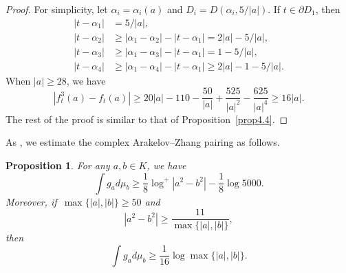\documentclass[10pt,a4paper]{amsart}
\numberwithin{equation}{section}
\theoremstyle{plain}
\newtheorem{prop}[thm]{Proposition}
\theoremstyle{definition}
\theoremstyle{remark}
\begin{document}
\begin{proof}
For simplicity, let $\alpha_{i}=\alpha_{i}(a)$ and $D_{i}=D(\alpha_{i},5/|a|)$.
If $t\in\partial D_{1}$, then
\begin{align*}
|t-\alpha_{1}| & =5/|a|,\\
|t-\alpha_{2}| & \geq|\alpha_{1}-\alpha_{2}|-|t-\alpha_{1}|=2|a|-5/|a|,\\
|t-\alpha_{3}| & \geq|\alpha_{1}-\alpha_{3}|-|t-\alpha_{1}|=1-5/|a|,\\
|t-\alpha_{4}| & \geq|\alpha_{1}-\alpha_{4}|-|t-\alpha_{1}|\geq2|a|-1-5/|a|.
\end{align*}
When $|a|\geq28$, we have
\[
\left|f_{t}^{3}(a)-f_{t}(a)\right|\geq20|a|-110-\frac{50}{|a|}+\frac{525}{|a|^{2}}-\frac{625}{|a|^{4}}\geq16|a|.
\]
The rest of the proof is similar to that of Proposition~\ref{prop4.4}.
\end{proof}

As \cite[Theorem 4.1]{DKY2}, we estimate the complex Arakelov--Zhang
pairing as follows.

\begin{prop}\label{prop4.6}
For any $a,b\in K$, we have
\[
\int g_{a}d\mu_{b}\geq\frac{1}{8}\log^{+}\left|a^{2}-b^{2}\right|-\frac{1}{8}\log5000.
\]
Moreover, if\, $\max\{|a|,|b|\}\geq50$ and
\begin{equation}
\left|a^{2}-b^{2}\right|\geq\frac{11}{\max\{|a|,|b|\}},\label{eq4.1}
\end{equation}
then
\[
\int g_{a}d\mu_{b}\geq\frac{1}{16}\log\max\{|a|,|b|\}.
\]
\end{prop}
\end{document}
